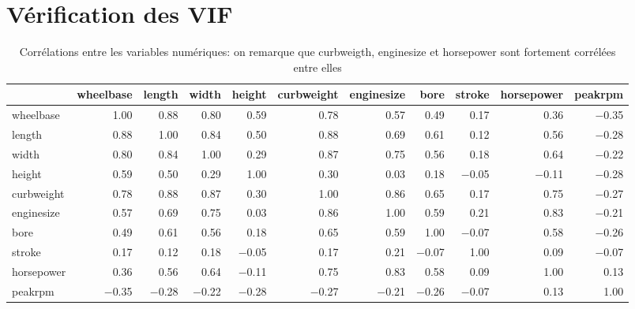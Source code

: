 \documentclass[11pt,a4paper]{article}
\begin{document}
\section{Vérification des VIF}
\begin{table}
	\scriptsize
	\centering
	\begin{tabulary}{1\textwidth}{|L|R|R|R|R|R|R|R|R|R|R|}
	\hline
 &    wheelbase &    length &    width &    height &    curbweight &    enginesize &    bore &    stroke &    horsepower &    peakrpm\\\hline

wheelbase &    1.00 &    0.88 &    0.80 &    0.59 &    0.78 &    0.57 &    0.49 &    0.17 &    0.36 &    $-$0.35\\\hline
length &    0.88 &    1.00 &    0.84 &    0.50 &    0.88 &    0.69 &    0.61 &    0.12 &    0.56 &    $-$0.28\\\hline
width &    0.80 &    0.84 &    1.00 &    0.29 &    0.87 &    0.75 &    0.56 &    0.18 &    0.64 &    $-$0.22\\\hline
height &    0.59 &    0.50 &    0.29 &    1.00 &    0.30 &    0.03 &    0.18 &    $-$0.05 &    $-$0.11 &    $-$0.28\\\hline
curbweight &    0.78 &    0.88 &    0.87 &    0.30 &    1.00 &    0.86 &    0.65 &    0.17 &    0.75 &    $-$0.27\\\hline
enginesize &    0.57 &    0.69 &    0.75 &    0.03 &    0.86 &    1.00 &    0.59 &    0.21 &    0.83 &    $-$0.21\\\hline
bore &    0.49 &    0.61 &    0.56 &    0.18 &    0.65 &    0.59 &    1.00 &    $-$0.07 &    0.58 &    $-$0.26\\\hline
stroke &    0.17 &    0.12 &    0.18 &    $-$0.05 &    0.17 &    0.21 &    $-$0.07 &    1.00 &    0.09 &    $-$0.07\\\hline
horsepower &    0.36 &    0.56 &    0.64 &    $-$0.11 &    0.75 &    0.83 &    0.58 &    0.09 &    1.00 &    0.13\\\hline
peakrpm &    $-$0.35 &    $-$0.28 &    $-$0.22 &    $-$0.28 &    $-$0.27 &    $-$0.21 &    $-$0.26 &    $-$0.07 &    0.13 &    1.00\\\hline

	
\end{tabulary}
			\caption{Corrélations entre les variables numériques: on remarque que curbweigth, enginesize et horsepower sont fortement corrélées entre elles}
			\label{table:corrvif}
		\end{table}
\end{document}
